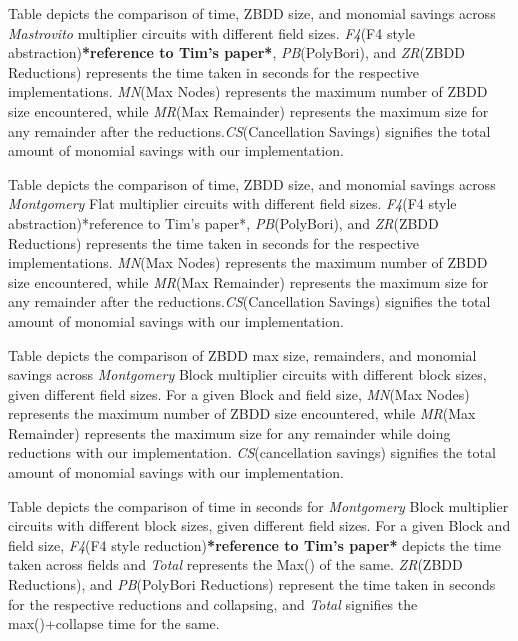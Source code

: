 \documentclass{article}
\begin{document}
Table  depicts the comparison of time, ZBDD size, and monomial savings across \textit{Mastrovito} multiplier circuits with different field sizes. \textit{F4}(F4 style abstraction)\textbf{*reference to Tim's paper*}, \textit{PB}(PolyBori), and \textit{ZR}(ZBDD Reductions) represents the time taken in seconds for the respective implementations. \textit{MN}(Max Nodes) represents the maximum number of ZBDD size encountered, while \textit{MR}(Max Remainder) represents the maximum size for any remainder after the reductions.\textit{CS}(Cancellation Savings) signifies the total amount of monomial savings with our implementation.

Table  depicts the comparison of time, ZBDD size, and monomial savings across \textit{Montgomery} Flat multiplier circuits with different field sizes. \textit{F4}(F4 style abstraction)*reference to Tim's paper*, \textit{PB}(PolyBori), and \textit{ZR}(ZBDD Reductions) represents the time taken in seconds for the respective implementations. \textit{MN}(Max Nodes) represents the maximum number of ZBDD size encountered, while \textit{MR}(Max Remainder) represents the maximum size for any remainder after the reductions.\textit{CS}(Cancellation Savings) signifies the total amount of monomial savings with our implementation.

Table  depicts the comparison of ZBDD max size, remainders, and monomial savings across \textit{Montgomery} Block multiplier circuits with different block sizes, given different field sizes. For a given Block and field size, \textit{MN}(Max Nodes) represents the maximum number of ZBDD size encountered, while \textit{MR}(Max Remainder) represents the maximum size for any remainder while doing reductions with our implementation. \textit{CS}(cancellation savings) signifies the total amount of monomial savings with our implementation.

Table  depicts the comparison of time in seconds for  \textit{Montgomery} Block multiplier circuits with different block sizes, given different field sizes. For a given Block and field size,  \textit{F4}(F4 style reduction)\textbf{*reference to Tim's paper*} depicts the time taken across fields and \textit{Total} represents the Max() of the same. \textit{ZR}(ZBDD Reductions), and \textit{PB}(PolyBori Reductions) represent the time taken in seconds for the respective reductions and collapsing, and \textit{Total} signifies the max()+collapse time for the same.
\end{document}
